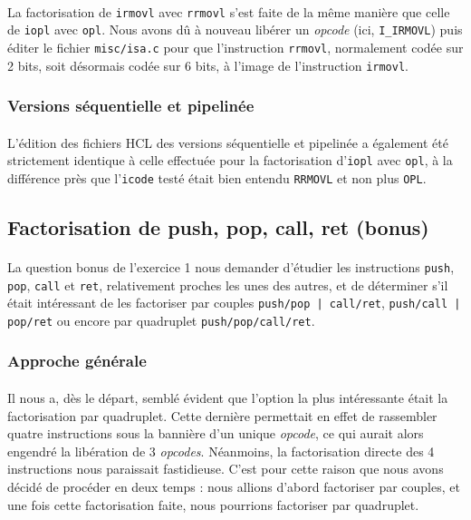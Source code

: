 \documentclass[12pt]{article}
\begin{document}
\paragraph{}La factorisation de \verb+irmovl+ avec \verb+rrmovl+ s'est faite de la même manière que celle de \verb+iopl+ avec \verb+opl+. Nous avons dû à nouveau libérer un {\itshape opcode} (ici, \verb+I_IRMOVL+) puis  éditer le fichier \verb+misc/isa.c+ pour que l'instruction \verb+rrmovl+, normalement codée sur 2 bits, soit désormais codée sur 6 bits, à l'image de l'instruction \verb+irmovl+.

\subsubsection{Versions séquentielle et pipelinée}
\paragraph{}L'édition des fichiers HCL des versions séquentielle et pipelinée a également été strictement identique à celle effectuée pour la factorisation d'\verb+iopl+ avec \verb+opl+, à la différence près que l'\verb+icode+ testé était bien entendu \verb+RRMOVL+ et non plus \verb+OPL+.



\subsection{Factorisation de push, pop, call, ret (bonus)}
\paragraph{}La question bonus de l'exercice 1 nous demander d'étudier les instructions \verb+push+, \verb+pop+, \verb+call+ et \verb+ret+, relativement proches les unes des autres, et de déterminer s'il était intéressant de les factoriser par couples \verb+push/pop | call/ret+, \verb+push/call | pop/ret+ ou encore par quadruplet \verb+push/pop/call/ret+.

\subsubsection{Approche générale}
\paragraph{}Il nous a, dès le départ, semblé évident que l'option la plus intéressante était la factorisation par quadruplet. Cette dernière permettait en effet de rassembler quatre instructions sous la bannière d'un unique {\itshape opcode}, ce qui aurait alors engendré la libération de 3 {\itshape opcodes}. Néanmoins, la factorisation directe des 4 instructions nous paraissait fastidieuse. C'est pour cette raison que nous avons décidé de procéder en deux temps : nous allions d'abord factoriser par couples, et une fois cette factorisation faite, nous pourrions factoriser par quadruplet.
\end{document}
